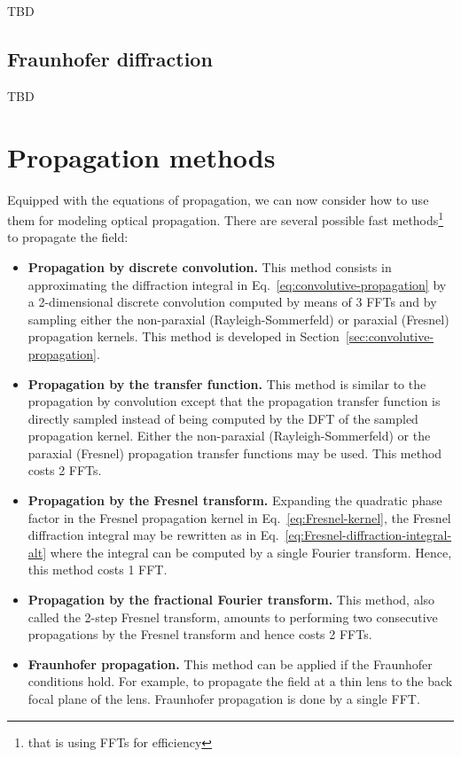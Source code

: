\documentclass[a4paper]{article}
\newcommand{\oops}[1]{{\color{purple}#1}}
\begin{document}
\oops{TBD}

\subsection{Fraunhofer diffraction}

\oops{TBD}

\newpage
\section{Propagation methods}

Equipped with the equations of propagation, we can now consider how to use them for
modeling optical propagation. There are several possible fast methods\footnote{that is
  using FFTs for efficiency} to propagate the field:
\begin{itemize}
\item \textbf{Propagation by discrete convolution.} This method consists in approximating
      the diffraction integral in Eq.~\eqref{eq:convolutive-propagation} by a
      2-dimensional discrete convolution computed by means of 3 FFTs and by sampling
      either the non-paraxial (Rayleigh-Sommerfeld) or paraxial (Fresnel) propagation
      kernels. This method is developed in Section~\ref{sec:convolutive-propagation}.
\item \textbf{Propagation by the transfer function.} This method is similar to the
      propagation by convolution except that the propagation transfer function is directly
      sampled instead of being computed by the DFT of the sampled propagation kernel.
      Either the non-paraxial (Rayleigh-Sommerfeld) or the paraxial (Fresnel) propagation
      transfer functions may be used. This method costs 2 FFTs.
\item \textbf{Propagation by the Fresnel transform.} Expanding the quadratic phase factor
      in the Fresnel propagation kernel in Eq.~\eqref{eq:Fresnel-kernel}, the Fresnel
      diffraction integral may be rewritten as in
      Eq.~\eqref{eq:Fresnel-diffraction-integral-alt} where the integral can be computed
      by a single Fourier transform. Hence, this method costs 1 FFT.
\item \textbf{Propagation by the fractional Fourier transform.} This method, also called
      the 2-step Fresnel transform, amounts to performing two consecutive propagations by
      the Fresnel transform and hence costs 2 FFTs.
\item \textbf{Fraunhofer propagation.} This method can be applied if the Fraunhofer
      conditions hold. For example, to propagate the field at a thin lens to the back
      focal plane of the lens. Fraunhofer propagation is done by a single FFT.
\end{itemize}
\end{document}
